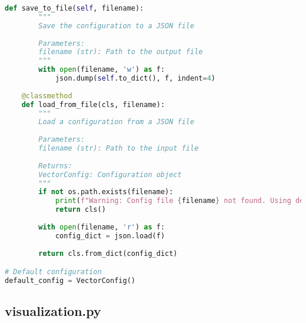 \begin{lstlisting}[language=Python]
    def save_to_file(self, filename):
        """
        Save the configuration to a JSON file
        
        Parameters:
        filename (str): Path to the output file
        """
        with open(filename, 'w') as f:
            json.dump(self.to_dict(), f, indent=4)
    
    @classmethod
    def load_from_file(cls, filename):
        """
        Load a configuration from a JSON file
        
        Parameters:
        filename (str): Path to the input file
        
        Returns:
        VectorConfig: Configuration object
        """
        if not os.path.exists(filename):
            print(f"Warning: Config file {filename} not found. Using default configuration.")
            return cls()
        
        with open(filename, 'r') as f:
            config_dict = json.load(f)
        
        return cls.from_dict(config_dict)

# Default configuration
default_config = VectorConfig()
\end{lstlisting}

\subsection{visualization.py}

